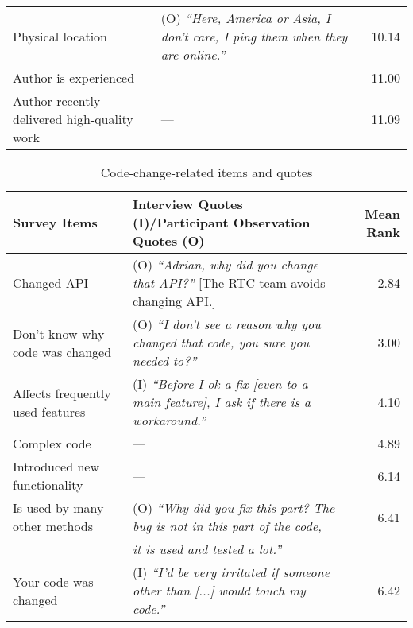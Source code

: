 \begin{sidewaystable}
\begin{tabular}{l@{\hspace{5pt}}l@{\hspace{-10pt}}r}
Physical location &(O) \emph{``Here, America or Asia, I don't care, I ping them when they are online.''}& 10.14\\%
Author is experienced &--- & 11.00\\%
Author recently delivered high-quality work &--- & 11.09\\%
\bottomrule
\end{tabular}
\label{tab:sub-social}
\end{sidewaystable}

\begin{sidewaystable}
\small
\centering
\caption{Code-change-related items and quotes}
\begin{tabular}{l@{\hspace{-10pt}}l@{\hspace{-20pt}}r}
\toprule
Survey Items & Interview Quotes (I)/Participant Observation Quotes (O) & Mean Rank\\
\midrule
Changed API &(O) \emph{``Adrian, why did you change that API?''} [The RTC team avoids changing API.] & 2.84\\%
Don't know why code was changed &(O) \emph{``I don't see a reason why you changed that code, you sure you needed to?''}& 3.00\\%
Affects frequently used features &(I) \emph{``Before I ok a fix [even to a main feature], I ask if there is a workaround.''} & 4.10\\%
Complex code &--- & 4.89\\%
Introduced new functionality &--- & 6.14\\%
Is used by many other methods &(O) {\small\emph{``Why did you fix this part? The bug is not in this part of the code,}}& 6.41\\%
&\emph{ it is used and tested a lot.''}&\\
Your code was changed &(I) \emph{``I'd be very irritated if someone other than [...] would touch my code.''}& 6.42\\%

\end{tabular}
\end{sidewaystable}

